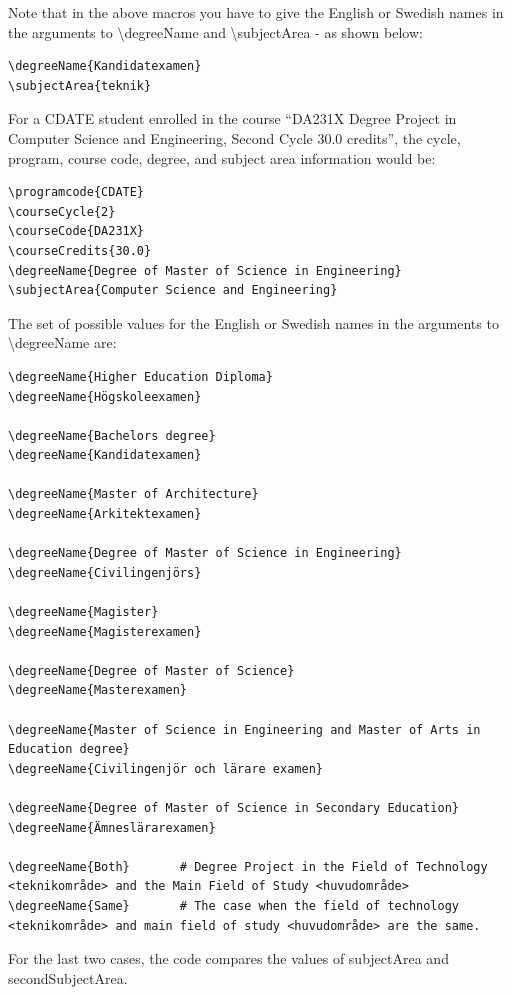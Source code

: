 \documentclass[examplethesis.tex]{subfiles}
\begin{document}
Note that in the above macros you have to give the English or Swedish names in the arguments to \textbackslash degreeName and \textbackslash subjectArea - as shown below:
\begin{lstlisting}[style=latexExampleForAuthors]
\degreeName{Kandidatexamen}
\subjectArea{teknik}
\end{lstlisting}

For a CDATE student enrolled in the course ``DA231X Degree Project in Computer Science and Engineering, Second Cycle 30.0 credits'', the cycle, program, course code, degree, and subject area information would be:
\begin{lstlisting}[style=latexExampleForAuthors]
\programcode{CDATE}
\courseCycle{2}
\courseCode{DA231X}
\courseCredits{30.0}
\degreeName{Degree of Master of Science in Engineering}
\subjectArea{Computer Science and Engineering}
\end{lstlisting}

The set of possible values for the English or Swedish names in the arguments to \textbackslash degreeName are:
\begin{lstlisting}[style=latexExampleForAuthors]
\degreeName{Higher Education Diploma}
\degreeName{Högskoleexamen}

\degreeName{Bachelors degree}
\degreeName{Kandidatexamen}

\degreeName{Master of Architecture}
\degreeName{Arkitektexamen}

\degreeName{Degree of Master of Science in Engineering}
\degreeName{Civilingenjörs}

\degreeName{Magister}
\degreeName{Magisterexamen}

\degreeName{Degree of Master of Science}
\degreeName{Masterexamen}

\degreeName{Master of Science in Engineering and Master of Arts in Education degree}
\degreeName{Civilingenjör och lärare examen}

\degreeName{Degree of Master of Science in Secondary Education}
\degreeName{Ämneslärarexamen}

\degreeName{Both}		# Degree Project in the Field of Technology <teknikområde> and the Main Field of Study <huvudområde>
\degreeName{Same}		# The case when the field of technology <teknikområde> and main field of study <huvudområde> are the same.
\end{lstlisting}

For the last two cases, the code compares the values of subjectArea and secondSubjectArea.
\end{document}
